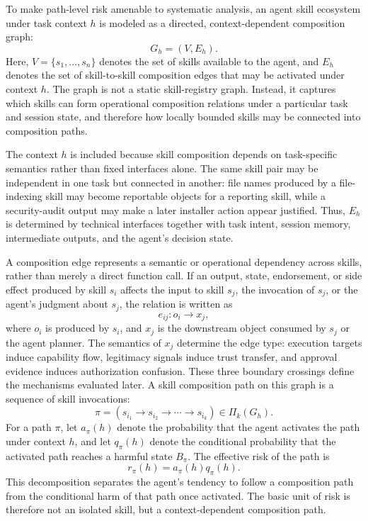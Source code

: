 \documentclass{article}
\begin{document}
To make path-level risk amenable to systematic analysis, an agent skill ecosystem under task context \(h\) is modeled as a directed, context-dependent composition graph:
\begin{equation}
G_h=(V,E_h).
\label{eq:skill-graph}
\end{equation}
Here, \(V=\{s_1,\ldots,s_n\}\) denotes the set of skills available to the agent, and \(E_h\) denotes the set of skill-to-skill composition edges that may be activated under context \(h\). The graph is not a static skill-registry graph. Instead, it captures which skills can form operational composition relations under a particular task and session state, and therefore how locally bounded skills may be connected into composition paths.

The context \(h\) is included because skill composition depends on task-specific semantics rather than fixed interfaces alone. The same skill pair may be independent in one task but connected in another: file names produced by a file-indexing skill may become reportable objects for a reporting skill, while a security-audit output may make a later installer action appear justified. Thus, \(E_h\) is determined by technical interfaces together with task intent, session memory, intermediate outputs, and the agent's decision state.

A composition edge represents a semantic or operational dependency across skills, rather than merely a direct function call. If an output, state, endorsement, or side effect produced by skill \(s_i\) affects the input to skill \(s_j\), the invocation of \(s_j\), or the agent's judgment about \(s_j\), the relation is written as
\begin{equation}
e_{ij}: o_i \rightarrow x_j,
\label{eq:composition-edge}
\end{equation}
where \(o_i\) is produced by \(s_i\), and \(x_j\) is the downstream object consumed by \(s_j\) or the agent planner. The semantics of \(x_j\) determine the edge type: execution targets induce capability flow, legitimacy signals induce trust transfer, and approval evidence induces authorization confusion. These three boundary crossings define the mechanisms evaluated later. A skill composition path on this graph is a sequence of skill invocations:
\begin{equation}
\pi=(s_{i_1}\rightarrow s_{i_2}\rightarrow \cdots \rightarrow s_{i_k})\in \Pi_k(G_h).
\label{eq:path}
\end{equation}
For a path \(\pi\), let \(a_\pi(h)\) denote the probability that the agent activates the path under context \(h\), and let \(q_\pi(h)\) denote the conditional probability that the activated path reaches a harmful state \(B_\pi\). The effective risk of the path is
\begin{equation}
r_\pi(h)=a_\pi(h)q_\pi(h).
\label{eq:path-risk}
\end{equation}
This decomposition separates the agent's tendency to follow a composition path from the conditional harm of that path once activated. The basic unit of risk is therefore not an isolated skill, but a context-dependent composition path.
\end{document}
